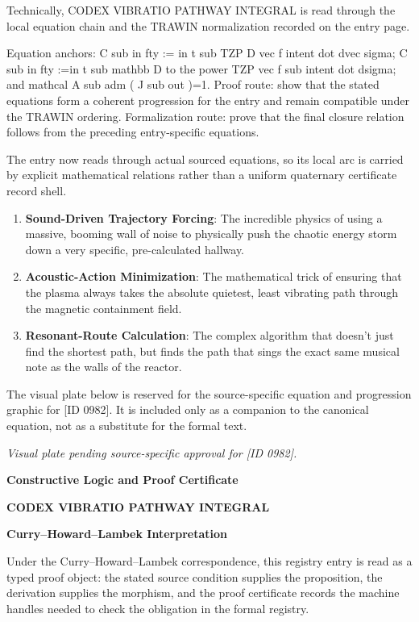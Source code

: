 Technically, CODEX VIBRATIO PATHWAY INTEGRAL is read through the local equation chain and the TRAWIN normalization recorded on the entry page.

Equation anchors: C sub in fty := in t sub TZP D vec f intent dot dvec sigma; C sub in fty :=in t sub mathbb D to the power TZP vec f sub intent dot dsigma; and mathcal A sub adm ( J sub out )=1. Proof route: show that the stated equations form a coherent progression for the entry and remain compatible under the TRAWIN ordering. Formalization route: prove that the final closure relation follows from the preceding entry-specific equations.

The entry now reads through actual sourced equations, so its local arc is carried by explicit mathematical relations rather than a uniform quaternary certificate record shell.
\endgroup

\begin{enumerate}[leftmargin=1.6em,itemsep=6pt,topsep=4pt]
\item \textbf{Sound-Driven Trajectory Forcing}: The incredible physics of using a massive, booming wall of noise to physically push the chaotic energy storm down a very specific, pre-calculated hallway.
\item \textbf{Acoustic-Action Minimization}: The mathematical trick of ensuring that the plasma always takes the absolute quietest, least vibrating path through the magnetic containment field.
\item \textbf{Resonant-Route Calculation}: The complex algorithm that doesn't just find the shortest path, but finds the path that sings the exact same musical note as the walls of the reactor.
\end{enumerate}

\begingroup\footnotesize\sloppy
The visual plate below is reserved for the source-specific equation and progression graphic for [ID 0982]. It is included only as a companion to the canonical equation, not as a substitute for the formal text.
\par\endgroup
\begingroup\footnotesize\itshape
Visual plate pending source-specific approval for [ID 0982].
\par\endgroup

\clearpage
\begingroup\tzpsupportsetup
\noindent\textbf{\fontsize{10.8pt}{12.8pt}\selectfont [ID 0982] Constructive Logic and Proof Certificate}\par
\noindent\textbf{\fontsize{10pt}{12pt}\selectfont CODEX VIBRATIO PATHWAY INTEGRAL}\par
\vspace{0.45em}
\begingroup
\footnotesize
\setlength{\parskip}{0.22em}
\setlength{\parindent}{0pt}
\noindent\textbf{Curry--Howard--Lambek Interpretation}\par
Under the Curry--Howard--Lambek correspondence, this registry entry is read as a typed proof
object: the stated source condition supplies the proposition, the derivation supplies the
morphism, and the proof certificate records the machine handles needed to check the obligation
in the formal registry.

